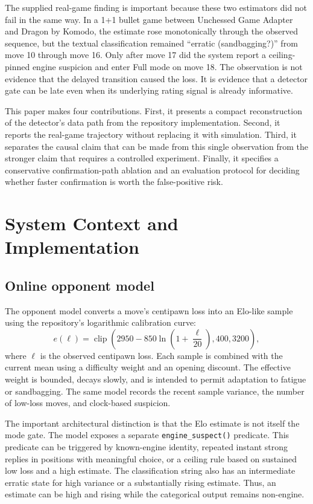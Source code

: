 \documentclass[conference]{IEEEtran}
\begin{document}
The supplied real-game finding is important because these two estimators did not fail in the same way. In a 1+1 bullet game between Unchessed Game Adapter and Dragon by Komodo, the estimate rose monotonically through the observed sequence, but the textual classification remained ``erratic (sandbagging?)'' from move 10 through move 16. Only after move 17 did the system report a ceiling-pinned engine suspicion and enter Full mode on move 18. The observation is not evidence that the delayed transition caused the loss. It is evidence that a detector gate can be late even when its underlying rating signal is already informative.

This paper makes four contributions. First, it presents a compact reconstruction of the detector's data path from the repository implementation. Second, it reports the real-game trajectory without replacing it with simulation. Third, it separates the causal claim that can be made from this single observation from the stronger claim that requires a controlled experiment. Finally, it specifies a conservative confirmation-path ablation and an evaluation protocol for deciding whether faster confirmation is worth the false-positive risk.

\section{System Context and Implementation}
\subsection{Online opponent model}
The opponent model converts a move's centipawn loss into an Elo-like sample using the repository's logarithmic calibration curve:
\begin{equation}
    e(\ell)=\operatorname{clip}\left(2950-850\ln\left(1+\frac{\ell}{20}\right),400,3200\right),
\end{equation}
where $\ell$ is the observed centipawn loss. Each sample is combined with the current mean using a difficulty weight and an opening discount. The effective weight is bounded, decays slowly, and is intended to permit adaptation to fatigue or sandbagging. The same model records the recent sample variance, the number of low-loss moves, and clock-based suspicion.

The important architectural distinction is that the Elo estimate is not itself the mode gate. The model exposes a separate \texttt{engine\_suspect()} predicate. This predicate can be triggered by known-engine identity, repeated instant strong replies in positions with meaningful choice, or a ceiling rule based on sustained low loss and a high estimate. The classification string also has an intermediate erratic state for high variance or a substantially rising estimate. Thus, an estimate can be high and rising while the categorical output remains non-engine.
\end{document}
